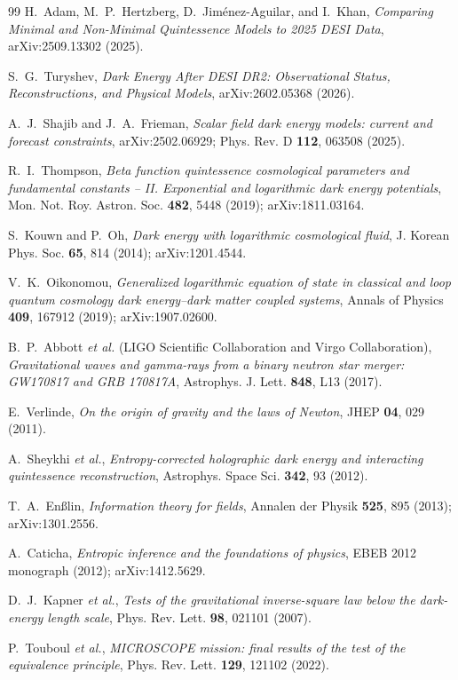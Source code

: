 \documentclass[11pt,reqno]{amsart}
\theoremstyle{plain}
\theoremstyle{definition}
\theoremstyle{remark}
\begin{document}
\begin{thebibliography}{99}
H.~Adam, M.~P.~Hertzberg, D.~Jim\'enez-Aguilar, and I.~Khan,
\emph{Comparing Minimal and Non-Minimal Quintessence Models to 2025 DESI Data},
arXiv:2509.13302 (2025).

S.~G.~Turyshev,
\emph{Dark Energy After DESI DR2: Observational Status, Reconstructions, and Physical Models},
arXiv:2602.05368 (2026).

A.~J.~Shajib and J.~A.~Frieman,
\emph{Scalar field dark energy models: current and forecast constraints},
arXiv:2502.06929; Phys. Rev. D \textbf{112}, 063508 (2025).

R.~I.~Thompson,
\emph{Beta function quintessence cosmological parameters and fundamental
constants -- II. Exponential and logarithmic dark energy potentials},
Mon. Not. Roy. Astron. Soc. \textbf{482}, 5448 (2019); arXiv:1811.03164.

S.~Kouwn and P.~Oh,
\emph{Dark energy with logarithmic cosmological fluid},
J. Korean Phys. Soc. \textbf{65}, 814 (2014); arXiv:1201.4544.

V.~K.~Oikonomou,
\emph{Generalized logarithmic equation of state in classical and loop
quantum cosmology dark energy--dark matter coupled systems},
Annals of Physics \textbf{409}, 167912 (2019); arXiv:1907.02600.

B.~P.~Abbott \emph{et al.} (LIGO Scientific Collaboration and Virgo Collaboration),
\emph{Gravitational waves and gamma-rays from a binary neutron star merger:
GW170817 and GRB 170817A},
Astrophys. J. Lett. \textbf{848}, L13 (2017).

E.~Verlinde,
\emph{On the origin of gravity and the laws of Newton},
JHEP \textbf{04}, 029 (2011).

A.~Sheykhi \emph{et al.},
\emph{Entropy-corrected holographic dark energy and interacting quintessence reconstruction},
Astrophys. Space Sci. \textbf{342}, 93 (2012).

T.~A.~En{\ss}lin,
\emph{Information theory for fields},
Annalen der Physik \textbf{525}, 895 (2013); arXiv:1301.2556.

A.~Caticha,
\emph{Entropic inference and the foundations of physics},
EBEB 2012 monograph (2012); arXiv:1412.5629.

D.~J.~Kapner \emph{et al.},
\emph{Tests of the gravitational inverse-square law below the dark-energy length scale},
Phys. Rev. Lett. \textbf{98}, 021101 (2007).

P.~Touboul \emph{et al.},
\emph{MICROSCOPE mission: final results of the test of the equivalence principle},
Phys. Rev. Lett. \textbf{129}, 121102 (2022).

\end{thebibliography}
\end{document}
